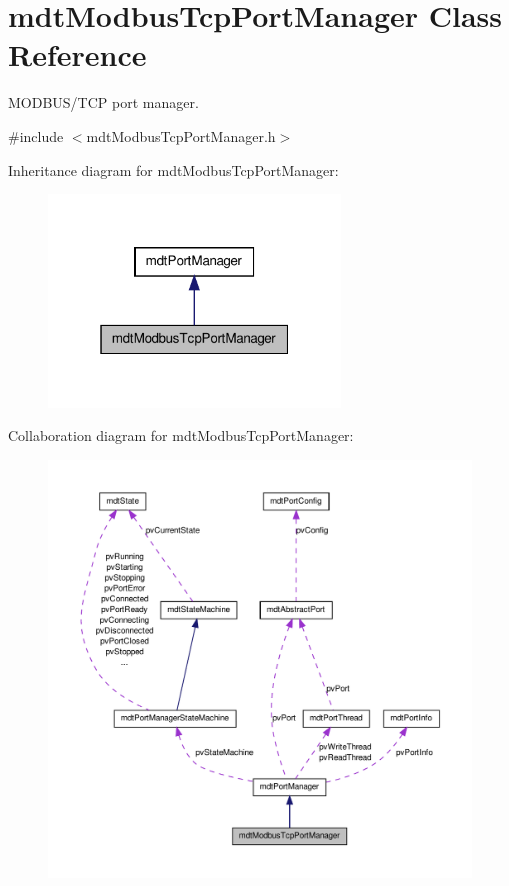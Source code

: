 \hypertarget{classmdt_modbus_tcp_port_manager}{
\section{mdtModbusTcpPortManager Class Reference}
\label{classmdt_modbus_tcp_port_manager}
}


MODBUS/TCP port manager.  




{\ttfamily \#include $<$mdtModbusTcpPortManager.h$>$}



Inheritance diagram for mdtModbusTcpPortManager:\nopagebreak
\begin{figure}[H]
\begin{center}
\leavevmode
\includegraphics[width=220pt]{classmdt_modbus_tcp_port_manager__inherit__graph}
\end{center}
\end{figure}


Collaboration diagram for mdtModbusTcpPortManager:
\nopagebreak
\begin{figure}[H]
\begin{center}
\leavevmode
\includegraphics[width=400pt]{classmdt_modbus_tcp_port_manager__coll__graph}
\end{center}
\end{figure}
